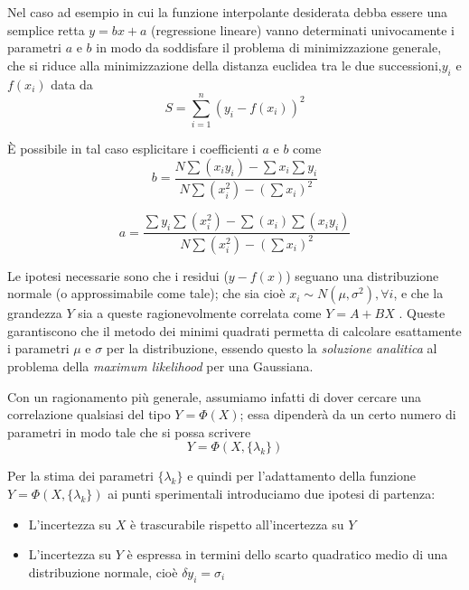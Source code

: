 \documentclass[12pt,openright,twoside,a4paper]{book}
\begin{document}
Nel caso ad esempio in cui la funzione interpolante desiderata debba essere una semplice retta $y=bx+a$ (regressione lineare) vanno determinati univocamente i parametri $a$ e $b$ in modo da soddisfare il problema di minimizzazione generale, che si riduce alla minimizzazione della distanza euclidea tra le due successioni,$y_i$ e $f(x_i)$ data da
\begin{equation}
 S = \sum_{i=1}^n \left(y_i - f(x_i)\right)^2
\end{equation}

È possibile in tal caso esplicitare i coefficienti $a$ e $b$ come
\begin{equation}
b=\frac{ N \sum (x_i y_i) - \sum x_i \sum y_i}{N\sum (x_i^2)-(\sum x_i)^2}
\end{equation}

\begin{equation}
a=\frac{\sum y_i \sum (x_i^2)- \sum (x_i) \sum (x_i y_i)}{N\sum (x_i^2)-(\sum x_i)^2}
\end{equation}

Le ipotesi necessarie sono che i residui ($y-f(x)$) seguano una distribuzione normale (o approssimabile come tale); che sia cioè $x_{i}\sim N(\mu,\sigma^{2}), \forall i$, e che la grandezza $Y$ sia a queste ragionevolmente correlata come $Y=A+BX$ .
Queste garantiscono che il metodo dei minimi quadrati permetta di calcolare esattamente i parametri $\mu$ e $\sigma$ per la distribuzione, essendo questo la \textit{soluzione analitica} al problema della \textit{maximum likelihood} per una Gaussiana.

Con un ragionamento più generale, assumiamo infatti di dover cercare una correlazione qualsiasi del tipo $Y=\Phi(X)$; essa dipenderà da un certo numero di parametri in modo tale che si possa scrivere
\begin{equation}
Y=\Phi(X,\{\lambda_k\})
\end{equation}

Per la stima dei parametri $\{\lambda_k\}$ e quindi per l'adattamento della funzione $Y=\Phi(X,\{\lambda_k\})$ ai punti sperimentali introduciamo due ipotesi di partenza:
\begin{itemize}
\item L'incertezza su $X$ è trascurabile rispetto all'incertezza su $Y$
\item L'incertezza su $Y$ è espressa in termini dello scarto quadratico medio di una distribuzione normale, cioè $\delta y_i=\sigma_i$
\end{itemize}
\end{document}
